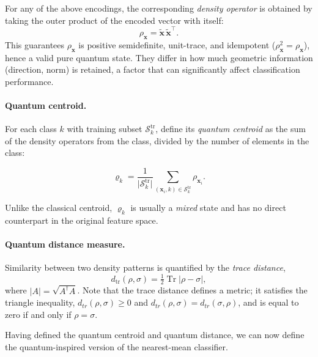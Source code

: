 \documentclass[twocolumn]{article} %
\begin{document}
\medskip
For any of the above encodings, the corresponding \emph{density
operator} is obtained by taking the outer product of the encoded
vector with itself:
\[
  \rho_{\mathbf x}= \tilde{\mathbf x}\,
                    \tilde{\mathbf x}^{\!\top}.
\]
This guarantees \(\rho_{\mathbf x}\) is positive semidefinite,
unit-trace, and idempotent (\(\rho_{\mathbf x}^{2}=\rho_{\mathbf x}\)),
hence a valid pure quantum state.
They differ in how much geometric information (direction, norm) is retained, a factor that can
significantly affect classification performance.

\paragraph{Quantum centroid.}
For each class \(k\) with training subset
\(\mathcal S_{k}^{\mathrm{tr}}\), define its \emph{quantum centroid} as the sum of the density operators from the class, divided by the number of elements in the class:

\[
\varrho_{k}=\frac{1}{\lvert\mathcal S_{k}^{\mathrm{tr}}\rvert}
            \sum_{(\mathbf x_i,k)\in\mathcal S_{k}^{\mathrm{tr}}}
            \rho_{\mathbf x_i}.
\]

Unlike the classical centroid, \(\varrho_{k}\) is usually a
\emph{mixed} state and has no direct counterpart in the original
feature space.

\paragraph{Quantum distance measure.}
Similarity between two density patterns is quantified by the
\emph{trace distance},
\[
  d_{\operatorname{tr}}(\rho,\sigma)=
  \tfrac12\operatorname{Tr}\!\bigl|\rho-\sigma\bigr|,
\]
where \(\lvert A\rvert=\sqrt{A^{\dagger}A}\). Note that the trace distance defines a metric; it satisfies the triangle inequality, $d_{tr}(\rho, \sigma) \geq 0$ and $d_{tr}(\rho, \sigma) = d_{tr}(\sigma, \rho)$, and is equal to zero if and only if $\rho = \sigma$.

Having defined the quantum centroid and quantum distance, we can now define the quantum-inspired version of the nearest-mean classifier.
\end{document}
